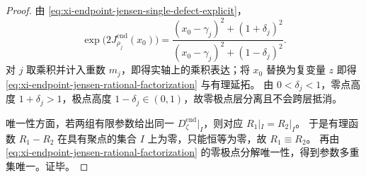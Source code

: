 \begin{proof}
由 \eqref{eq:xi-endpoint-jensen-single-defect-explicit}，
\[
\exp\!\bigl(2J_{\rho_j}^{\mathrm{end}}(x_0)\bigr)
=\frac{(x_0-\gamma_j)^2+(1+\delta_j)^2}{(x_0-\gamma_j)^2+(1-\delta_j)^2}.
\]
对 \(j\) 取乘积并计入重数 \(m_j\)，即得实轴上的乘积表达；将 \(x_0\) 替换为复变量 \(z\) 即得
\eqref{eq:xi-endpoint-jensen-rational-factorization} 与有理延拓。
由 \(0<\delta_j<1\)，零点高度 \(1+\delta_j>1\)，极点高度 \(1-\delta_j\in(0,1)\)，故零极点层分离且不会跨层抵消。

唯一性方面，若两组有限参数给出同一 \(D_{\zeta}^{\mathrm{end}}|_I\)，则对应
\(
R_1|_I=R_2|_I
\)。
于是有理函数 \(R_1-R_2\) 在具有聚点的集合 \(I\) 上为零，只能恒等为零，故 \(R_1\equiv R_2\)。
再由 \eqref{eq:xi-endpoint-jensen-rational-factorization} 的零极点分解唯一性，得到参数多重集唯一。证毕。
\end{proof}

\endinput
